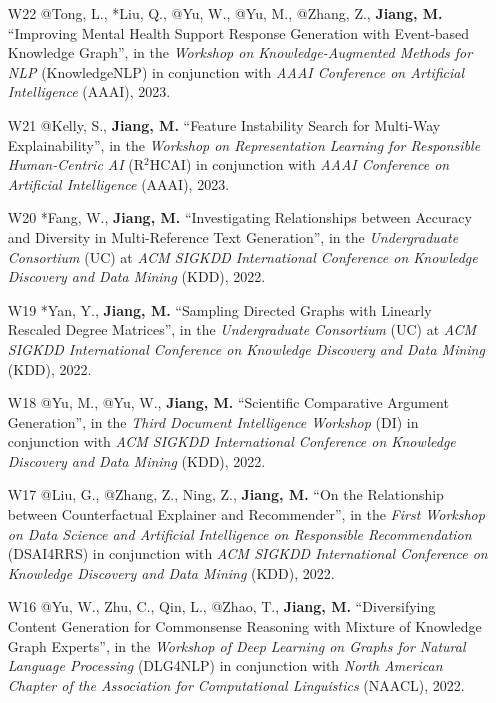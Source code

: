 \documentclass[10pt]{article}
\newenvironment{myindentpar}[1]%
{\begin{list}{}%
         {\setlength{\leftmargin}{#1}}%
         \item[]%
}
{\end{list}}
\newcounter{list}
\begin{document}
\begin{myindentpar}{0.00cm}
\begin{enumerate}[leftmargin=.5cm]
\item[W22] @Tong, L., *Liu, Q., @Yu, W., @Yu, M., @Zhang, Z., \textbf{Jiang, M.} ``Improving Mental Health Support Response Generation with Event-based Knowledge Graph'', in the \textit{Workshop on Knowledge-Augmented Methods for NLP} (KnowledgeNLP) in conjunction with \textit{AAAI Conference on Artificial Intelligence} (AAAI), 2023.

\item[W21] @Kelly, S., \textbf{Jiang, M.} ``Feature Instability Search for Multi-Way Explainability'', in the \textit{Workshop on Representation Learning for Responsible Human-Centric AI} (R$^2$HCAI) in conjunction with \textit{AAAI Conference on Artificial Intelligence} (AAAI), 2023.

\item[W20] *Fang, W., \textbf{Jiang, M.} ``Investigating Relationships between Accuracy and Diversity in Multi-Reference Text Generation'', in the \textit{Undergraduate Consortium} (UC) at \textit{ACM SIGKDD International Conference on Knowledge Discovery and Data Mining} (KDD), 2022.

\item[W19] *Yan, Y., \textbf{Jiang, M.} ``Sampling Directed Graphs with Linearly Rescaled Degree Matrices'', in the \textit{Undergraduate Consortium} (UC) at \textit{ACM SIGKDD International Conference on Knowledge Discovery and Data Mining} (KDD), 2022.

\item[W18] @Yu, M., @Yu, W., \textbf{Jiang, M.} ``Scientific Comparative Argument Generation'', in the \textit{Third Document Intelligence Workshop} (DI) in conjunction with \textit{ACM SIGKDD International Conference on Knowledge Discovery and Data Mining} (KDD), 2022.

\item[W17] @Liu, G., @Zhang, Z., Ning, Z., \textbf{Jiang, M.} ``On the Relationship between Counterfactual Explainer and Recommender'', in the \textit{First Workshop on Data Science and Artificial Intelligence on Responsible Recommendation} (DSAI4RRS) in conjunction with \textit{ACM SIGKDD International Conference on Knowledge Discovery and Data Mining} (KDD), 2022.

\item[W16] @Yu, W., Zhu, C., Qin, L., @Zhao, T., \textbf{Jiang, M.} ``Diversifying Content Generation for Commonsense Reasoning with Mixture of Knowledge Graph Experts'', in the \textit{Workshop of Deep Learning on Graphs for Natural Language Processing} (DLG4NLP) in conjunction with \textit{North American Chapter of the Association for Computational Linguistics} (NAACL), 2022.
		

\end{enumerate}
\end{myindentpar}
\end{document}
